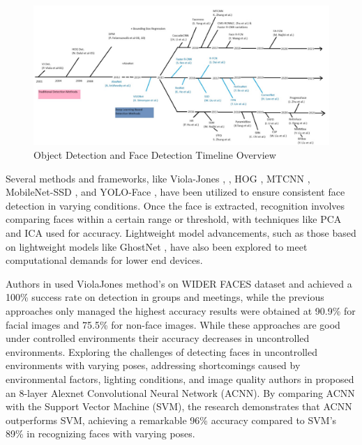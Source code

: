 \begin{figure}[htbp]
\centerline{\includegraphics[width=\columnwidth]{components/images/od-timeline.jpg}}
\caption{Object Detection and Face Detection Timeline Overview}
\label{od-timeline}
\end{figure}

Several methods and frameworks, like Viola-Jones \cite{sumanto_viola-jones_2022}, \cite{rani_face_2022}, HOG \cite{rani_face_2022}, MTCNN \cite{rani_face_2022}, MobileNet-SSD \cite{chan_face_2022}, and YOLO-Face \cite{wang_yolov5s-face_2022}, have been utilized to ensure consistent face detection in varying conditions. Once the face is extracted, recognition involves comparing faces within a certain range or threshold, with techniques like PCA and ICA used for accuracy. Lightweight model advancements, such as those based on lightweight models like GhostNet \cite{alansari_ghostfacenets_2023}, have also been explored to meet computational demands for lower end devices.

Authors in \cite{sumanto_viola-jones_2022} used ViolaJones method's on WIDER FACES dataset and achieved a 100\% success rate on detection in groups and meetings, while the previous approaches only managed the highest accuracy results were obtained at 90.9\% for facial images and 75.5\% for non-face images. While these approaches are good under controlled environments their accuracy decreases in uncontrolled environments. Exploring the challenges of detecting faces in uncontrolled environments with varying poses, addressing shortcomings caused by environmental factors, lighting conditions, and image quality authors in \cite{mahesh_smart_2022} proposed an 8-layer Alexnet Convolutional Neural Network (ACNN). By comparing ACNN with the Support Vector Machine (SVM), the research demonstrates that ACNN outperforms SVM, achieving a remarkable 96\% accuracy compared to SVM's 89\% in recognizing faces with varying poses.

